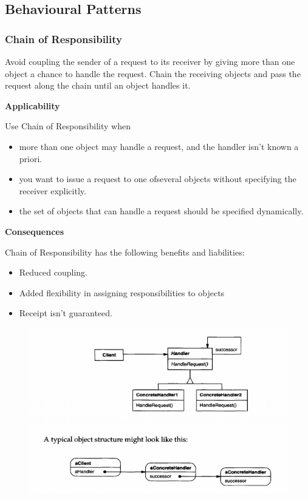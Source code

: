 \documentclass{article}
\begin{document}
\newpage
\subsection{Behavioural Patterns}
\subsubsection{Chain of Responsibility}
Avoid coupling the sender of a request to its receiver by giving more than one object a chance to handle the request. Chain the receiving objects and pass the request along the chain until an object handles it.

\textbf{Applicability}

Use Chain of Responsibility when

\begin{itemize}
    \item more than one object may handle a request, and the handler isn't known a priori.
    \item you want to issue a request to one ofseveral objects without specifying the receiver explicitly.
    \item the set of objects that can handle a request should be specified dynamically.
\end{itemize}

\textbf{Consequences}

Chain of Responsibility has the following benefits and liabilities:
\begin{itemize}
    \item Reduced coupling.
    \item Added flexibility in assigning responsibilities to objects
    \item Receipt isn't guaranteed.
\end{itemize}

\begin{figure}[h]
    \centering
    \includegraphics[width=14cm]{diagrams/pattern-13-chain-of-responsibility.png}
\end{figure}
\end{document}
